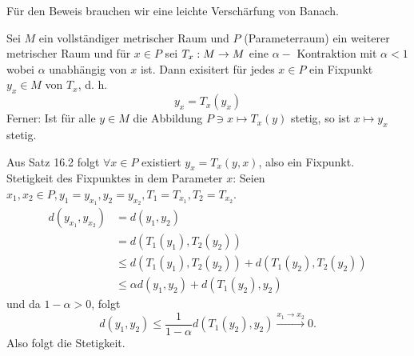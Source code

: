 \documentclass[../ana2.tex]{subfiles}
\begin{document}
Für den Beweis brauchen wir eine leichte Verschärfung von
Banach.
\begin{lem}
    Sei \( M \) ein vollständiger metrischer Raum und \( P \) 
    (Parameterraum) ein weiterer metrischer Raum und für \( x\in P \)     
    sei \(T_x:M\rightarrow M\) eine \(\alpha-\) Kontraktion mit \(\alpha < 1\)
    wobei \(\alpha\) unabhängig von \(x\) ist. Dann exisitert für jedes \(x \in P\)
    ein Fixpunkt \(y_x \in M\) von \(T_x\), d. h. 
    \[ y_x = T_x(y_x) \]
    Ferner: Ist für alle \(y \in M\) die Abbildung 
    \(P \ni x \mapsto T_x(y)\) stetig, so ist
    \( x \mapsto y_x \) stetig.
\end{lem}
\begin{bew}
    Aus Satz 16.2 folgt \( \forall x \in P \) 
    existiert \( y_x = T_x(y,x) \), also ein Fixpunkt.\\
    Stetigkeit des Fixpunktes in dem Parameter \( x \): 
    Seien \( x_1, x_2 \in P, y_1 = y_{x_1}, y_2 = y_{x_2}, 
    T_1 = T_{x_1}, T_2 = T_{x_2} \).
    \begin{align*}
        d(y_{x_1}, y_{x_2}) &= d(y_1, y_2) \\
        &= d(T_1(y_1), T_2(y_2)) \\
        &\leq d(T_1(y_1), T_2(y_2)) + d(T_1(y_2), T_2(y_2)) \\
        &\leq \alpha d(y_1, y_2) + d(T_1(y_2), y_2)
    \end{align*}
    und da \( 1-\alpha > 0 \), folgt 
    \[ d(y_1, y_2) \leq \frac{1}{1-\alpha} d(T_1(y_2),y_2) 
    \overset{x_1 \rightarrow x_2}{\longrightarrow} 0. \]
    Also folgt die Stetigkeit.
\end{bew}
\end{document}
